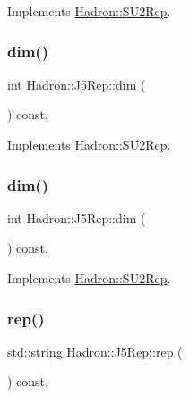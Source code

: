 Implements \mbox{\hyperlink{structHadron_1_1SU2Rep_a4feae466a054ad829ef37a71b46667b8}{Hadron\+::\+S\+U2\+Rep}}.

\mbox{\label{structHadron_1_1J5Rep_a3ae25f39e16107e667d4a57293cea52b}} 
\subsubsection{\texorpdfstring{dim()}{dim()}\hspace{0.1cm}{\footnotesize\ttfamily [2/3]}}
{\footnotesize\ttfamily int Hadron\+::\+J5\+Rep\+::dim (\begin{DoxyParamCaption}{ }\end{DoxyParamCaption}) const\hspace{0.3cm}{\ttfamily [inline]}, {\ttfamily [virtual]}}



Implements \mbox{\hyperlink{structHadron_1_1SU2Rep_a4feae466a054ad829ef37a71b46667b8}{Hadron\+::\+S\+U2\+Rep}}.

\mbox{\label{structHadron_1_1J5Rep_a3ae25f39e16107e667d4a57293cea52b}} 
\subsubsection{\texorpdfstring{dim()}{dim()}\hspace{0.1cm}{\footnotesize\ttfamily [3/3]}}
{\footnotesize\ttfamily int Hadron\+::\+J5\+Rep\+::dim (\begin{DoxyParamCaption}{ }\end{DoxyParamCaption}) const\hspace{0.3cm}{\ttfamily [inline]}, {\ttfamily [virtual]}}



Implements \mbox{\hyperlink{structHadron_1_1SU2Rep_a4feae466a054ad829ef37a71b46667b8}{Hadron\+::\+S\+U2\+Rep}}.

\mbox{\label{structHadron_1_1J5Rep_a21db8a3fe2ed5b61d05e4e9b0082fc37}} 
\subsubsection{\texorpdfstring{rep()}{rep()}\hspace{0.1cm}{\footnotesize\ttfamily [1/3]}}
{\footnotesize\ttfamily std\+::string Hadron\+::\+J5\+Rep\+::rep (\begin{DoxyParamCaption}{ }\end{DoxyParamCaption}) const\hspace{0.3cm}{\ttfamily [inline]}, {\ttfamily [virtual]}}



